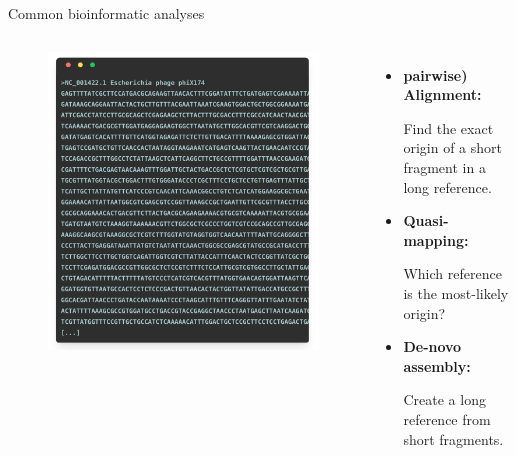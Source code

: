 \documentclass[10pt]{beamer}
\newcommand{\feature}[1]{{\color{scLime} \textbf{#1}}}
\begin{document}
\begin{frame}{Common bioinformatic analyses}
	\begin{columns}[T]
		\begin{figure}
			\includegraphics[width=\textwidth]{figures/phixgen.png}
		\end{figure}
		\vspace{1cm}
		\begin{itemize}
			\item \feature{pairwise) Alignment:} \par Find the exact origin of a short fragment in
			a long reference.
			\item \feature{Quasi-mapping:}\par Which reference is the most-likely origin?
			\item \feature{De-novo assembly:} \par Create a long reference from short
			fragments.
		\end{itemize}
	\end{columns}
\end{frame}
\end{document}
